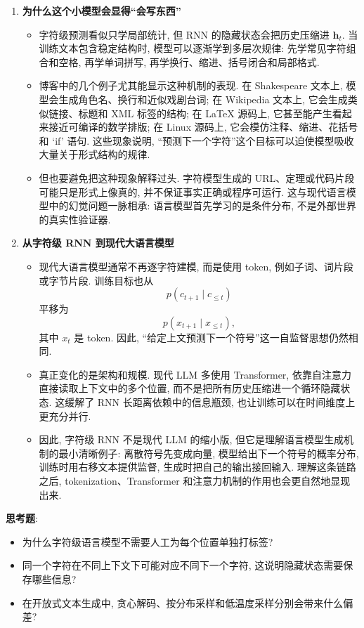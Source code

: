 \documentclass{../nndlcourse}
\begin{document}
\begin{enumerate}
\item \textbf{为什么这个小模型会显得“会写东西”}
  \begin{itemize}
    \item 字符级预测看似只学局部统计, 但 RNN 的隐藏状态会把历史压缩进 $\boldsymbol{h}_t$. 当训练文本包含稳定结构时, 模型可以逐渐学到多层次规律: 先学常见字符组合和空格, 再学单词拼写, 再学换行、缩进、括号闭合和局部格式.
    \item 博客中的几个例子尤其能显示这种机制的表现. 在 Shakespeare 文本上, 模型会生成角色名、换行和近似戏剧台词; 在 Wikipedia 文本上, 它会生成类似链接、标题和 XML 标签的结构; 在 LaTeX 源码上, 它甚至能产生看起来接近可编译的数学排版; 在 Linux 源码上, 它会模仿注释、缩进、花括号和 `if' 语句. 这些现象说明, “预测下一个字符”这个目标可以迫使模型吸收大量关于形式结构的规律.
    \item 但也要避免把这种现象解释过头. 字符模型生成的 URL、定理或代码片段可能只是形式上像真的, 并不保证事实正确或程序可运行. 这与现代语言模型中的幻觉问题一脉相承: 语言模型首先学习的是条件分布, 不是外部世界的真实性验证器.
  \end{itemize}

\item \textbf{从字符级 RNN 到现代大语言模型}
  \begin{itemize}
    \item 现代大语言模型通常不再逐字符建模, 而是使用 token, 例如子词、词片段或字节片段. 训练目标也从
    \begin{equation*}
      p(c_{t+1}\mid c_{\le t})
    \end{equation*}
    平移为
    \begin{equation*}
      p(x_{t+1}\mid x_{\le t}),
    \end{equation*}
    其中 $x_t$ 是 token. 因此, “给定上文预测下一个符号”这一自监督思想仍然相同.
    \item 真正变化的是架构和规模. 现代 LLM 多使用 Transformer, 依靠自注意力直接读取上下文中的多个位置, 而不是把所有历史压缩进一个循环隐藏状态. 这缓解了 RNN 长距离依赖中的信息瓶颈, 也让训练可以在时间维度上更充分并行.
    \item 因此, 字符级 RNN 不是现代 LLM 的缩小版, 但它是理解语言模型生成机制的最小清晰例子: 离散符号先变成向量, 模型给出下一个符号的概率分布, 训练时用右移文本提供监督, 生成时把自己的输出接回输入. 理解这条链路之后, tokenization、Transformer 和注意力机制的作用也会更自然地显现出来.
  \end{itemize}
\end{enumerate}

\textbf{思考题}:
\begin{itemize}
  \item 为什么字符级语言模型不需要人工为每个位置单独打标签?
  \item 同一个字符在不同上下文下可能对应不同下一个字符, 这说明隐藏状态需要保存哪些信息?
  \item 在开放式文本生成中, 贪心解码、按分布采样和低温度采样分别会带来什么偏差?
\end{itemize}
\end{document}
